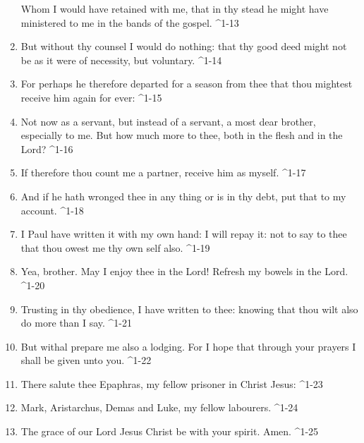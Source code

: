 \documentclass[
]{article}
\begin{document}
\begin{enumerate}
  Whom I would have retained with me, that in thy stead he might have
  ministered to me in the bands of the gospel. \^{}1-13
\item
  But without thy counsel I would do nothing: that thy good deed might
  not be as it were of necessity, but voluntary. \^{}1-14
\item
  For perhaps he therefore departed for a season from thee that thou
  mightest receive him again for ever: \^{}1-15
\item
  Not now as a servant, but instead of a servant, a most dear brother,
  especially to me. But how much more to thee, both in the flesh and in
  the Lord? \^{}1-16
\item
  If therefore thou count me a partner, receive him as myself. \^{}1-17
\item
  And if he hath wronged thee in any thing or is in thy debt, put that
  to my account. \^{}1-18
\item
  I Paul have written it with my own hand: I will repay it: not to say
  to thee that thou owest me thy own self also. \^{}1-19
\item
  Yea, brother. May I enjoy thee in the Lord! Refresh my bowels in the
  Lord. \^{}1-20
\item
  Trusting in thy obedience, I have written to thee: knowing that thou
  wilt also do more than I say. \^{}1-21
\item
  But withal prepare me also a lodging. For I hope that through your
  prayers I shall be given unto you. \^{}1-22
\item
  There salute thee Epaphras, my fellow prisoner in Christ Jesus:
  \^{}1-23
\item
  Mark, Aristarchus, Demas and Luke, my fellow labourers. \^{}1-24
\item
  The grace of our Lord Jesus Christ be with your spirit. Amen. \^{}1-25
\end{enumerate}
\end{document}
